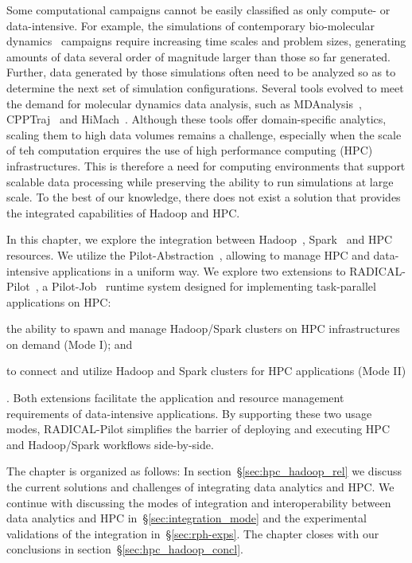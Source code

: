 Some computational campaigns cannot be easily classified as only compute- or data-intensive. For example, the simulations of contemporary bio-molecular dynamics~\cite{dror2012biomolecular} campaigns require increasing time scales and problem sizes,  generating amounts of data several order of magnitude larger than those so far generated. Further, data generated by those simulations often need to be analyzed so as to determine the next set of simulation configurations.
Several tools evolved to meet the demand for molecular dynamics data analysis, such as MDAnalysis~\cite{michaud2011mdanalysis,gowers2016mdanalysis}, CPPTraj~\cite{roe2013ptraj} and HiMach~\cite{tiankai2008scalable}.
Although these tools offer domain-specific analytics, scaling them to high data volumes remains a challenge, especially when the scale of teh computation erquires the use of high performance computing (HPC) infrastructures.
This is therefore a need for computing environments that support scalable data processing while preserving the ability to run simulations at large scale.
To the best of our knowledge, there does not exist a solution that provides the integrated capabilities of Hadoop and HPC.

In this chapter, we explore the integration between Hadoop~\cite{hadoop}, Spark~\cite{zaharia2010spark} and HPC resources.
We utilize the Pilot-Abstraction~\cite{luckow2012pstar}, allowing to manage HPC and data-intensive applications in a uniform way.
We explore two extensions to RADICAL-Pilot~\cite{merzky2018design}, a Pilot-Job~\cite{luckow2012pstar} runtime system designed for implementing task-parallel applications on HPC: 
\begin{inparaenum}[1)]
    \item the ability to spawn and manage Hadoop/Spark clusters on HPC infrastructures on demand (Mode I); and
    \item to connect and utilize Hadoop and Spark clusters for HPC applications (Mode II)
\end{inparaenum}.
Both extensions facilitate the application and resource management requirements of data-intensive applications.
By supporting these two usage modes, RADICAL-Pilot simplifies the barrier of deploying and executing HPC and Hadoop/Spark workflows side-by-side.

The chapter is organized as follows: In section~\S\ref{sec:hpc_hadoop_rel} we discuss the current solutions and challenges of integrating data analytics and HPC.
We continue with discussing the modes of integration and interoperability between data analytics and HPC in~\S\ref{sec:integration_mode} and the experimental validations of the integration in~\S\ref{sec:rph-exps}.
The chapter closes with our conclusions in section~\S\ref{sec:hpc_hadoop_concl}.


